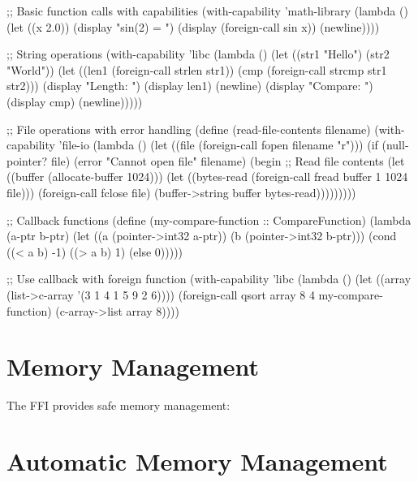 \begin{example}
\begin{lambdustcode}
;; Basic function calls with capabilities
(with-capability 'math-library
  (lambda ()
    (let ((x 2.0))
      (display "sin(2) = ") 
      (display (foreign-call sin x)) 
      (newline))))

;; String operations  
(with-capability 'libc
  (lambda ()
    (let ((str1 "Hello")
          (str2 "World"))
      (let ((len1 (foreign-call strlen str1))
            (cmp (foreign-call strcmp str1 str2)))
        (display "Length: ") (display len1) (newline)
        (display "Compare: ") (display cmp) (newline)))))

;; File operations with error handling
(define (read-file-contents filename)
  (with-capability 'file-io
    (lambda ()
      (let ((file (foreign-call fopen filename "r")))
        (if (null-pointer? file)
            (error "Cannot open file" filename)
            (begin
              ;; Read file contents
              (let ((buffer (allocate-buffer 1024)))
                (let ((bytes-read (foreign-call fread buffer 1 1024 file)))
                  (foreign-call fclose file)
                  (buffer->string buffer bytes-read)))))))))

;; Callback functions
(define (my-compare-function :: CompareFunction)
  (lambda (a-ptr b-ptr)
    (let ((a (pointer->int32 a-ptr))
          (b (pointer->int32 b-ptr)))
      (cond ((< a b) -1)
            ((> a b) 1)
            (else 0)))))

;; Use callback with foreign function
(with-capability 'libc
  (lambda ()  
    (let ((array (list->c-array '(3 1 4 1 5 9 2 6))))
      (foreign-call qsort array 8 4 my-compare-function)
      (c-array->list array 8))))
\end{lambdustcode}
\end{example}

\section{Memory Management}
\label{sec:ffi-memory}


The FFI provides safe memory management:

\section{Automatic Memory Management}
\label{sec:auto-memory}

